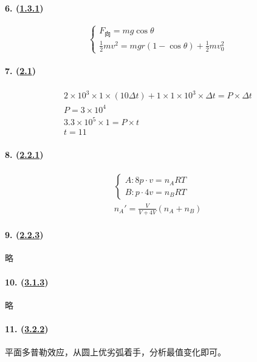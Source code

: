 \paragraph{6. (\hyperref[subsec:1.3.1]{1.3.1})}

\begin{equation*}
    \begin{cases}
        F_\textrm{向}=mg\cos\theta\\
        \frac12mv^2=mgr(1-\cos\theta)+\frac12mv_0^2
    \end{cases}
\end{equation*}

\paragraph{7. (\hyperref[sec:2.1]{2.1})}

\begin{gather*}
    2\times10^3\times1\times(10\Delta t)+1\times1\times10^3\times\Delta t=P\times\Delta t\\
    P=3\times10^4\\
    3.3\times10^5\times1=P\times t\\
    t=11
\end{gather*}

\paragraph{8. (\hyperref[subsec:2.2.1]{2.2.1})}

\begin{gather*}
    \begin{cases}
        A: 8p\cdot v=n_ART\\
        B: p\cdot 4v=n_BRT
    \end{cases}\\
    n_A'=\frac{V}{V+4V}(n_A+n_B)
\end{gather*}

\paragraph{9. (\hyperref[subsec:2.2.3]{2.2.3})} 略
\paragraph{10. (\hyperref[subsec:3.1.3]{3.1.3})} 略
\paragraph{11. (\hyperref[subsec:3.2.2]{3.2.2})} 平面多普勒效应，从圆上优劣弧着手，分析最值变化即可。
